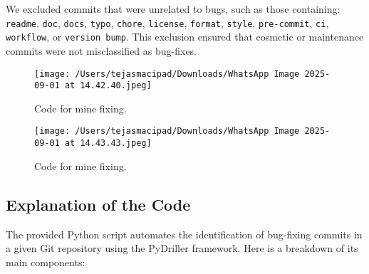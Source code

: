 \documentclass[12pt,a4paper]{article}
\begin{document}
We excluded commits that were unrelated to bugs, such as those containing: \texttt{readme}, \texttt{doc}, \texttt{docs}, \texttt{typo}, \texttt{chore}, \texttt{license}, \texttt{format}, \texttt{style}, \texttt{pre-commit}, \texttt{ci}, \texttt{workflow}, or \texttt{version bump}. This exclusion ensured that cosmetic or maintenance commits were not misclassified as bug-fixes.  

\begin{figure}[H]
    \centering
    \texttt{[image: /Users/tejasmacipad/Downloads/WhatsApp Image 2025-09-01 at 14.42.40.jpeg]}
    \caption{Code for mine fixing.}
\end{figure}

\begin{figure}[H]
    \centering
    \texttt{[image: /Users/tejasmacipad/Downloads/WhatsApp Image 2025-09-01 at 14.43.43.jpeg]}
    \caption{Code for mine fixing.}
\end{figure}

\newpage

\subsection*{Explanation of the Code}

The provided Python script automates the identification of bug-fixing commits in a given Git repository using the PyDriller framework. Here is a breakdown of its main components:
\end{document}
